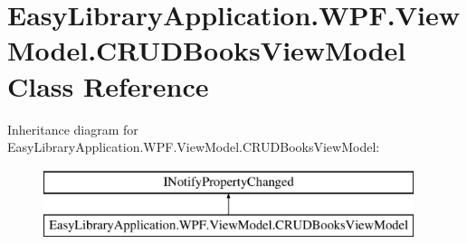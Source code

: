 \hypertarget{class_easy_library_application_1_1_w_p_f_1_1_view_model_1_1_c_r_u_d_books_view_model}{}\section{Easy\+Library\+Application.\+W\+P\+F.\+View\+Model.\+C\+R\+U\+D\+Books\+View\+Model Class Reference}
\label{class_easy_library_application_1_1_w_p_f_1_1_view_model_1_1_c_r_u_d_books_view_model}
Inheritance diagram for Easy\+Library\+Application.\+W\+P\+F.\+View\+Model.\+C\+R\+U\+D\+Books\+View\+Model\+:\begin{figure}[H]
\begin{center}
\leavevmode
\includegraphics[height=2.000000cm]{class_easy_library_application_1_1_w_p_f_1_1_view_model_1_1_c_r_u_d_books_view_model}
\end{center}
\end{figure}
